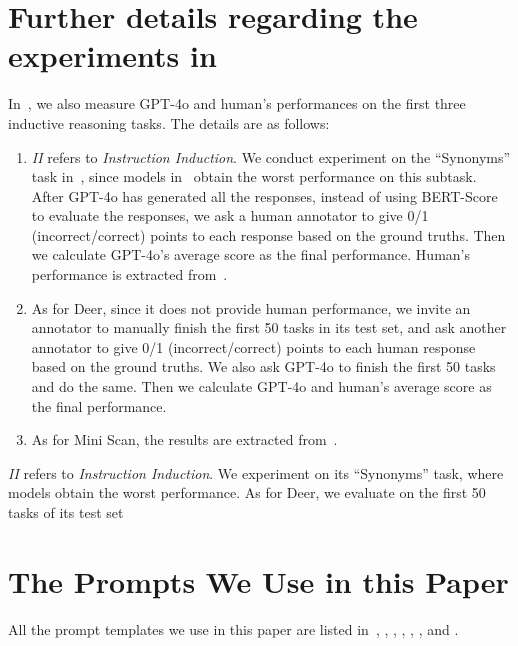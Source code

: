 \section{Further details regarding the experiments in~}
\label{appendix:inductive examples} 
In~, we also measure GPT-4o and human's performances on the first three inductive reasoning tasks. The details are as follows:
\begin{enumerate}
    \item \textit{II} refers to \textit{Instruction Induction}. We conduct experiment on the ``Synonyms'' task in~\citet{honovich2023instruction}, since models in~\cite{honovich2023instruction} obtain the worst performance on this subtask. After GPT-4o has generated all the responses, instead of using BERT-Score to evaluate the responses, we ask a human annotator to give 0/1 (incorrect/correct) points to each response based on the ground truths. Then we calculate GPT-4o's average score as the final performance. Human's performance is extracted from~\citet{honovich2023instruction}.
    \item As for Deer, since it does not provide human performance, we invite an annotator to manually finish the first 50 tasks in its test set, and ask another annotator to give 0/1 (incorrect/correct) points to each human response based on the ground truths. We also ask GPT-4o to finish the first 50 tasks and do the same. Then we calculate GPT-4o and human's average score as the final performance.
    \item As for Mini Scan, the results are extracted from~\cite{qiuphenomenal}.
\end{enumerate}
\textit{II} refers to \textit{Instruction Induction}. We experiment on its ``Synonyms'' task, where models obtain the worst performance. As for Deer, we evaluate on the first 50 tasks of its test set

\section{The Prompts We Use in this Paper}
\label{appendix:prompts}
All the prompt templates we use in this paper are listed in~, , , , , , and . 



